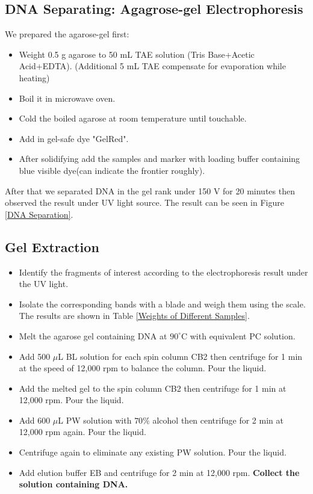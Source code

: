 \documentclass{article}
\begin{document}
\subsection{DNA Separating: Agagrose-gel Electrophoresis}
We prepared the agarose-gel first:
\begin{itemize}
    \item Weight 0.5 g agarose to 50 mL TAE solution (Tris Base+Acetic Acid+EDTA). (Additional 5 mL TAE compensate for evaporation while heating)
    \item Boil it in microwave oven.
    \item Cold the boiled agarose  at room temperature until touchable.
    \item Add in gel-safe dye "GelRed".
    \item After solidifying add the samples and marker with loading buffer containing blue visible dye(can indicate the frontier roughly).
\end{itemize}
After that we separated DNA in the gel rank under 150 V for 20 minutes then observed the result under UV light source. The result can be seen in Figure \ref{DNA Separation}.
\subsection{Gel Extraction}
\begin{itemize}
    \item Identify the fragments of interest according to the electrophoresis result under the UV light.
    \item Isolate the corresponding bands with a blade and weigh them using the scale. The results are shown in Table \ref{Weights of Different Samples}.

    \item Melt the agarose gel containing DNA at $90^\circ \mathrm{C}$ with equivalent PC solution.
    \item Add 500 $\mu$L BL solution for each spin column CB2 then centrifuge for 1 min at the speed of 12,000 rpm to balance the column. Pour the liquid.
    \item Add the melted gel to the spin column CB2 then centrifuge for 1 min at 12,000 rpm. Pour the liquid.
    \item Add 600 $\mu$L PW solution with $70\%$ alcohol then centrifuge for 2 min at 12,000 rpm again. Pour the liquid.
    \item Centrifuge again to eliminate any existing PW solution. Pour the liquid.
    \item Add elution buffer EB and centrifuge for 2 min at 12,000 rpm. \textbf{Collect the solution containing DNA.}
\end{itemize}
    
\end{document}
